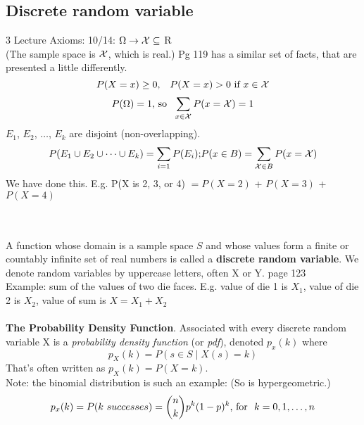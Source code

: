 \subsection{Discrete random variable}
3 Lecture Axioms: {\tiny 10/14}:   $\Omega \rightarrow {\cal X} \subseteq $ R   \hfill \\  
(The sample space is ${\cal X}$, which is real.)  Pg 119 has a similar set of facts, that are presented a little differently. 
 \hfill \\  
	\[  P(X=x) \geq 0 \mbox{, \ \  }  P(X=x) > 0  \mbox{ if } x \in {\cal X}  \]
	\[  P(\Omega) = 1 \mbox{, so \ }  \sum\limits_{x \in \cal X} P(x= {\cal X}) = 1\]
$E_1$, $E_2$, $\dots$, $E_k$ are disjoint (non-overlapping). 
	\[ P(E_1 \cup E_2 \cup \dots \cup E_k) =  \sum\limits_{i=1} P(E_i) \mbox{;} P(x \in B) = \sum\limits_{{\cal X} \in B} P(x = {\cal X}) \]
We have done this.  E.g. P(X is 2, 3, or 4) $= P(X=2)$ + $P(X=3)$ + $P(X=4)$
	
     \hfill \\  
  \hfill \\  
A function whose domain is a sample space $S$ and whose values form a finite or countably infinite set of real numbers is called a \textbf{discrete random variable}.  We denote random variables by uppercase letters, often X or Y.  {\tiny page 123}  \hfill \\
Example: sum of the values of two die faces.  E.g. value of die 1 is $X_1$, value of die 2 is $X_2$, value of sum is $X = X_1 + X_2$    \hfill \\  
  \hfill \\  
  
\textbf{The Probability Density Function}.  Associated with every discrete random variable X is a \textit{probability density function} (or \textit{pdf}), denoted $p_x(k)$ where 
	\[  p_X(k) = P({s \in S \mid X(s) = k})  \]
That's often written as $ p_X(k) = P(X = k) $.  \hfill \\  
Note: the binomial distribution is such an example:   (So is hypergeometric.) 
	\[  p_x(k) = P(k \mbox \ successes) = {{n}\choose{k}}p^k(1-p)^k \mbox{, for \ } k = 0, 1, \dots, n \]


